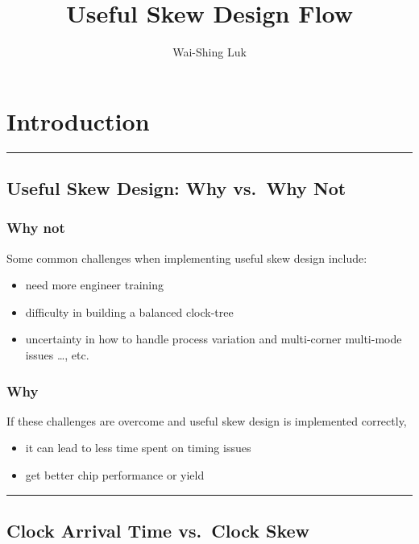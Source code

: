 \documentclass[
]{article}
\title{Useful Skew Design Flow}
\author{Wai-Shing Luk}
\date{}
\providecommand{\tightlist}{%
  \setlength{\itemsep}{0pt}\setlength{\parskip}{0pt}}
\begin{document}
\maketitle

\section{Introduction}\label{introduction}

\begin{center}\rule{0.5\linewidth}{0.5pt}\end{center}

\subsection{Useful Skew Design: Why vs.~Why Not}\label{sec:first}

\subsubsection{Why not}\label{why-not}

Some common challenges when implementing useful skew design include:

\begin{itemize}
\tightlist
\item
  need more engineer training
\item
  difficulty in building a balanced clock-tree
\item
  uncertainty in how to handle process variation and multi-corner multi-mode issues
  \ldots, etc.
\end{itemize}

\subsubsection{Why}\label{why}

If these challenges are overcome and useful skew design is implemented correctly,

\begin{itemize}
\tightlist
\item
  it can lead to less time spent on timing issues
\item
  get better chip performance or yield
\end{itemize}

\begin{center}\rule{0.5\linewidth}{0.5pt}\end{center}

\subsection{Clock Arrival Time vs.~Clock Skew}\label{clock-arrival-time-vs.-clock-skew}
\end{document}
